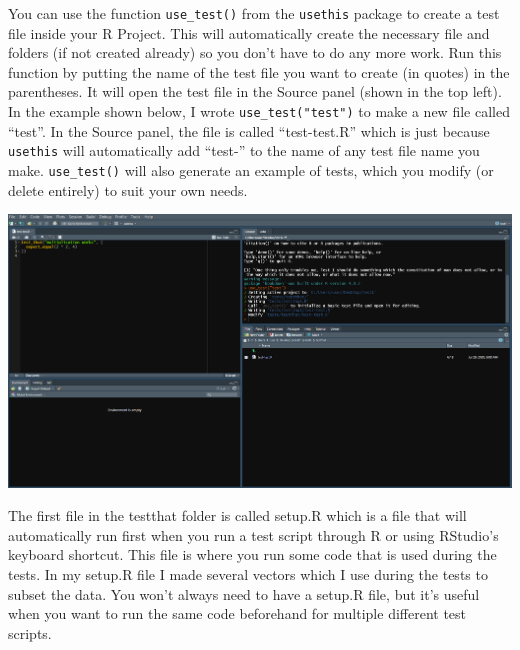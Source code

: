 \documentclass[
  12pt,
]{book}
\begin{document}
You can use the function \texttt{use\_test()} from the \texttt{usethis} package to create a test file inside your R Project. This will automatically create the necessary file and folders (if not created already) so you don't have to do any more work. Run this function by putting the name of the test file you want to create (in quotes) in the parentheses. It will open the test file in the Source panel (shown in the top left). In the example shown below, I wrote \texttt{use\_test("test")} to make a new file called ``test''. In the Source panel, the file is called ``test-test.R'' which is just because \texttt{usethis} will automatically add ``test-'' to the name of any test file name you make. \texttt{use\_test()} will also generate an example of tests, which you modify (or delete entirely) to suit your own needs.

\includegraphics{images/usethis_test.PNG}

The first file in the testthat folder is called setup.R which is a file that will automatically run first when you run a test script through R or using RStudio's keyboard shortcut. This file is where you run some code that is used during the tests. In my setup.R file I made several vectors which I use during the tests to subset the data. You won't always need to have a setup.R file, but it's useful when you want to run the same code beforehand for multiple different test scripts.
\end{document}
